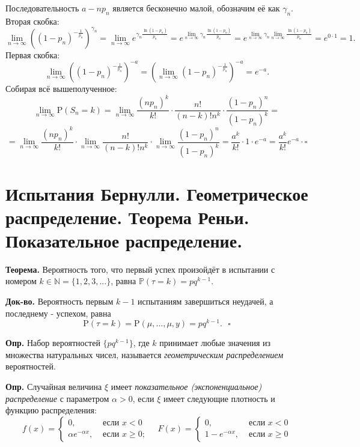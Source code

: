 \documentclass[oneside,final,14pt]{extreport}
\newcommand\mydef{{\bf Опр.}}
\newcommand\myth{{\bf Теорема.}}
\newcommand\myqed{{\bf Док-во.}}
\newcommand\myprob[1]{{\mathbb{P}(#1)}}
\theoremstyle{definition}
\begin{document}
Последовательность $a - np_n$ является бесконечно малой, обозначим её как $\gamma_n.$ Вторая скобка:
$$\lim _{n \to \infty}\left(\left(1-p_{n}\right)^{-\frac{1}{p_{n}}}\right)^{\gamma_{n}}=\lim _{n \to \infty} e^{\gamma_{n} \frac{\ln \left(1-p_{n}\right)}{p_{n}}}=e^{\lim\limits _{n \to \infty} \gamma_{n} \frac{\ln \left(1-p_{n}\right)}{p_{n}}}=e^{\lim\limits _{n \to \infty} \gamma_{n} \lim\limits_{n \to \infty} \frac{\ln \left(1-p_{n}\right)}{p_{n}}}=e^{0 \cdot 1}=1.$$
Первая скобка:
$$\lim _{n \to \infty}\left(\left(1-p_{n}\right)^{-\frac{1}{p_{n}}}\right)^{-a}=\left(\lim _{n \to \infty}\left(1-p_{n}\right)^{-\frac{1}{p_{n}}}\right)^{-a}=e^{-a}.$$
Собирая всё вышеполученное:
$$\lim _{n \to \infty} \mathrm{P}\left(S_{n}=k\right)=\lim _{n \to \infty} \frac{\left(n p_{n}\right)^{k}}{k !} \cdot \frac{n !}{(n-k) ! n^{k}} \cdot \frac{\left(1-p_{n}\right)^{n}}{\left(1-p_{n}\right)^{k}} = $$
$$=\lim _{n \to \infty} \frac{\left(n p_{n}\right)^{k}}{k !} \cdot \lim _{n \to \infty} \frac{n !}{(n-k) ! n^{k}} \cdot \lim _{n \to \infty} \frac{\left(1-p_{n}\right)^{n}}{\left(1-p_{n}\right)^{k}}=\frac{a^{k}}{k !} \cdot 1 \cdot e^{-a}=\frac{a^{k}}{k !} e^{-a} \cdot \square$$

\section {Испытания Бернулли. Геометрическое распределение. Теорема Реньи. Показательное распределение.}

\myth{} Вероятность того, что первый успех произойдёт в испытании с номером $k \in \mathbb{N} = \{1, 2, 3, ...\}$, равна $\myprob{\tau = k} = pq^{k-1}$.

\myqed{} Вероятность первым $k - 1$ испытаниям завершиться неудачей, а последнему - успехом, равна 
$$\mathrm{P}(\tau=k)=\mathrm{P}(\mu, \ldots, \mu, y)=p q^{k-1}. ~~~ \square$$

\mydef{} Набор вероятностей $\{p q^{k-1}\}$, где $k$ принимает любые значения из множества натуральных чисел, называется {\it геометрическим распределением} вероятностей. 

\mydef{} Случайная величина $\xi$ имеет {\it показательное (экспоненциальное) распределение} с параметром $\alpha > 0$, если $\xi$ имеет следующие плотность и функцию распределения:
$$f(x)=\left\{\begin{array}{cc}
0, & \text { если } x<0 \\
\alpha e^{-\alpha x}, & \text { если } x \geqslant 0 ;
\end{array} \quad F(x)=\left\{\begin{array}{cc}
0, & \text { если } x<0 \\
1-e^{-\alpha x}, & \text { если } x \geqslant 0
\end{array}\right.\right.$$
\end{document}
